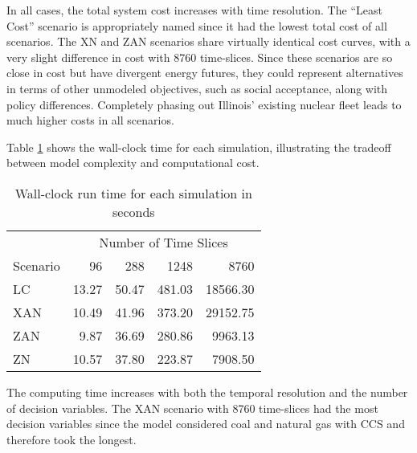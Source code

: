 In all cases, the total system cost increases with time resolution. The ``Least
Cost'' scenario is appropriately named since it had the lowest total cost
of all scenarios. The XN and ZAN scenarios share virtually identical cost curves,
with a very slight difference in cost with 8760 time-slices. Since these scenarios
are so close in cost but have divergent energy futures, they could represent
alternatives in terms of other unmodeled objectives, such as social acceptance,
along with policy differences. Completely phasing out Illinois' existing nuclear
fleet leads to much higher costs in all scenarios.


Table \ref{tab:time_res_clock} shows the
wall-clock time for each simulation, illustrating the tradeoff between model
complexity and computational cost.

\begin{table}[H]
  \centering
  \caption{Wall-clock run time for each simulation in seconds}
  \label{tab:time_res_clock}
  \begin{tabular}{l*{4}{r}}
    \toprule
    & \multicolumn{4}{c}{Number of Time Slices}\\
    Scenario & 96 & 288 & 1248&8760\\
    \midrule
    LC &13.27&50.47&481.03&18566.30\\
    XAN &10.49&41.96&373.20&29152.75\\
    ZAN &9.87&36.69&280.86&9963.13\\
    ZN & 10.57&37.80&223.87&7908.50\\
    \bottomrule
  \end{tabular}
\end{table}

The computing time increases with both the temporal resolution and the number of
decision variables. The XAN scenario with 8760 time-slices had the most decision
variables since the model considered coal and natural gas with CCS and therefore took
the longest.

